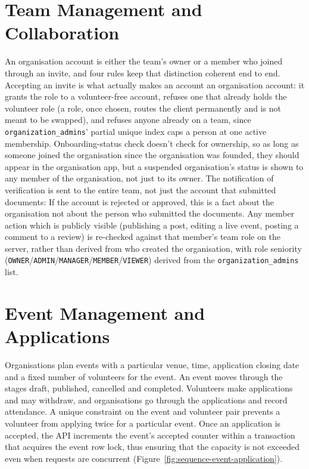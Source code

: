 \section{Team Management and Collaboration}
\label{sec:impl-team}
An organisation account is either the team's owner or a member who joined through an invite, and four rules keep that distinction coherent end to end. Accepting an invite is what actually makes an account an organisation account: it grants the role to a volunteer-free account, refuses one that already holds the volunteer role (a role, once chosen, routes the client permanently and is not meant to be swapped), and refuses anyone already on a team, since \texttt{organization\_admins}' partial unique index caps a person at one active membership. Onboarding-status check doesn't check for ownership, so as long as someone joined the organisation since the organisation was founded, they should appear in the organisation app, but a suspended organisation's status is shown to any member of the organisation, not just to its owner. The notification of verification is sent to the entire team, not just the account that submitted documents: If the account is rejected or approved, this is a fact about the organisation not about the person who submitted the documents. Any member action which is publicly visible (publishing a post, editing a live event, posting a comment to a review) is re-checked against that member's team role on the server, rather than derived from who created the organisation, with role seniority (\texttt{OWNER}/\texttt{ADMIN}/\texttt{MANAGER}/\texttt{MEMBER}/\texttt{VIEWER}) derived from the \texttt{organization\_admins} list.

\section{Event Management and Applications}
\label{sec:impl-events}
Organisations plan events with a particular venue, time, application closing date and a fixed number of volunteers for the event. An event moves through the stages draft, published, cancelled and completed. Volunteers make applications and may withdraw, and organisations go through the applications and record attendance. A unique constraint on the event and volunteer pair prevents a volunteer from applying twice for a particular event. Once an application is accepted, the API increments the event's accepted counter within a transaction that acquires the event row lock, thus ensuring that the capacity is not exceeded even when requests are concurrent (Figure~\ref{fig:sequence-event-application}).

